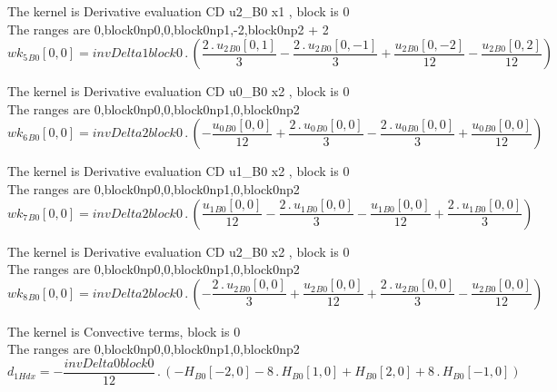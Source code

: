 \documentclass{article}
\begin{document}
\noindent The kernel is Derivative evaluation CD u2_B0 x1 , block is 0\\\noindent The ranges are 0,block0np0,0,block0np1,-2,block0np2 + 2\\\begin{dmath}{wk_{5}{_{B0}}}[{0,0}] = invDelta1block0 \,.\, \left(\frac{2 \,.\, {u_{2}{_{B0}}}[{0,1}]}{3} - \frac{2 \,.\, {u_{2}{_{B0}}}[{0,-1}]}{3} + \frac{{u_{2}{_{B0}}}[{0,-2}]}{12} - \frac{{u_{2}{_{B0}}}[{0,2}]}{12}\right)\end{dmath}

\noindent The kernel is Derivative evaluation CD u0_B0 x2 , block is 0\\\noindent The ranges are 0,block0np0,0,block0np1,0,block0np2\\\begin{dmath}{wk_{6}{_{B0}}}[{0,0}] = invDelta2block0 \,.\, \left(- \frac{{u_{0}{_{B0}}}[{0,0}]}{12} + \frac{2 \,.\, {u_{0}{_{B0}}}[{0,0}]}{3} - \frac{2 \,.\, {u_{0}{_{B0}}}[{0,0}]}{3} + \frac{{u_{0}{_{B0}}}[{0,0}]}{12}\right)\end{dmath}

\noindent The kernel is Derivative evaluation CD u1_B0 x2 , block is 0\\\noindent The ranges are 0,block0np0,0,block0np1,0,block0np2\\\begin{dmath}{wk_{7}{_{B0}}}[{0,0}] = invDelta2block0 \,.\, \left(\frac{{u_{1}{_{B0}}}[{0,0}]}{12} - \frac{2 \,.\, {u_{1}{_{B0}}}[{0,0}]}{3} - \frac{{u_{1}{_{B0}}}[{0,0}]}{12} + \frac{2 \,.\, {u_{1}{_{B0}}}[{0,0}]}{3}\right)\end{dmath}

\noindent The kernel is Derivative evaluation CD u2_B0 x2 , block is 0\\\noindent The ranges are 0,block0np0,0,block0np1,0,block0np2\\\begin{dmath}{wk_{8}{_{B0}}}[{0,0}] = invDelta2block0 \,.\, \left(- \frac{2 \,.\, {u_{2}{_{B0}}}[{0,0}]}{3} + \frac{{u_{2}{_{B0}}}[{0,0}]}{12} + \frac{2 \,.\, {u_{2}{_{B0}}}[{0,0}]}{3} - \frac{{u_{2}{_{B0}}}[{0,0}]}{12}\right)\end{dmath}

\noindent The kernel is Convective terms, block is 0\\\noindent The ranges are 0,block0np0,0,block0np1,0,block0np2\\\begin{dmath}d_{1 H dx} = - \frac{invDelta0block0}{12} \,.\, \left(- {H{_{B0}}}[{-2,0}] - 8 \,.\, {H{_{B0}}}[{1,0}] + {H{_{B0}}}[{2,0}] + 8 \,.\, {H{_{B0}}}[{-1,0}]\right)\end{dmath}
\end{document}
